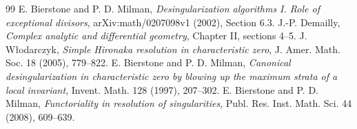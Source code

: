 \documentclass[11pt,a4paper]{article}
\theoremstyle{definition}
\begin{document}






\begin{thebibliography}{99}
 E. Bierstone and P. D. Milman, \emph{Desingularization algorithms I. Role of exceptional divisors}, arXiv:math/0207098v1 (2002), Section 6.3.
 J.-P. Demailly, \emph{Complex analytic and differential geometry}, Chapter II, sections 4--5.
 J. W{\l}odarczyk, \emph{Simple Hironaka resolution in characteristic zero}, J. Amer. Math. Soc. 18 (2005), 779--822.
 E. Bierstone and P. D. Milman, \emph{Canonical desingularization in characteristic zero by blowing up the maximum strata of a local invariant}, Invent. Math. 128 (1997), 207--302.
 E. Bierstone and P. D. Milman, \emph{Functoriality in resolution of singularities}, Publ. Res. Inst. Math. Sci. 44 (2008), 609--639.
\end{thebibliography}
\end{document}
